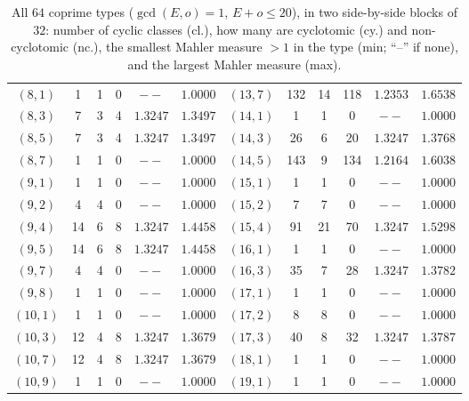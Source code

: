 \begin{table}[h]
\begin{tabular}{@{}cccccc@{\qquad}cccccc@{}}
$(8,1)$ & 1 & 1 & 0 & $--$ & $1.0000$ & $(13,7)$ & 132 & 14 & 118 & $1.2353$ & $1.6538$ \\
$(8,3)$ & 7 & 3 & 4 & $1.3247$ & $1.3497$ & $(14,1)$ & 1 & 1 & 0 & $--$ & $1.0000$ \\
$(8,5)$ & 7 & 3 & 4 & $1.3247$ & $1.3497$ & $(14,3)$ & 26 & 6 & 20 & $1.3247$ & $1.3768$ \\
$(8,7)$ & 1 & 1 & 0 & $--$ & $1.0000$ & $(14,5)$ & 143 & 9 & 134 & $1.2164$ & $1.6038$ \\
$(9,1)$ & 1 & 1 & 0 & $--$ & $1.0000$ & $(15,1)$ & 1 & 1 & 0 & $--$ & $1.0000$ \\
$(9,2)$ & 4 & 4 & 0 & $--$ & $1.0000$ & $(15,2)$ & 7 & 7 & 0 & $--$ & $1.0000$ \\
$(9,4)$ & 14 & 6 & 8 & $1.3247$ & $1.4458$ & $(15,4)$ & 91 & 21 & 70 & $1.3247$ & $1.5298$ \\
$(9,5)$ & 14 & 6 & 8 & $1.3247$ & $1.4458$ & $(16,1)$ & 1 & 1 & 0 & $--$ & $1.0000$ \\
$(9,7)$ & 4 & 4 & 0 & $--$ & $1.0000$ & $(16,3)$ & 35 & 7 & 28 & $1.3247$ & $1.3782$ \\
$(9,8)$ & 1 & 1 & 0 & $--$ & $1.0000$ & $(17,1)$ & 1 & 1 & 0 & $--$ & $1.0000$ \\
$(10,1)$ & 1 & 1 & 0 & $--$ & $1.0000$ & $(17,2)$ & 8 & 8 & 0 & $--$ & $1.0000$ \\
$(10,3)$ & 12 & 4 & 8 & $1.3247$ & $1.3679$ & $(17,3)$ & 40 & 8 & 32 & $1.3247$ & $1.3787$ \\
$(10,7)$ & 12 & 4 & 8 & $1.3247$ & $1.3679$ & $(18,1)$ & 1 & 1 & 0 & $--$ & $1.0000$ \\
$(10,9)$ & 1 & 1 & 0 & $--$ & $1.0000$ & $(19,1)$ & 1 & 1 & 0 & $--$ & $1.0000$ \\
\bottomrule
\end{tabular}
\caption{All $64$ coprime types ($\gcd(E,o)=1$, $E+o\le20$), in two side-by-side blocks
of $32$: number of cyclic classes (cl.), how many are cyclotomic (cy.) and non-cyclotomic
(nc.), the smallest Mahler measure $>1$ in the type (min; ``--'' if none), and the largest
Mahler measure (max).}\label{tab:summary}
\end{table}
